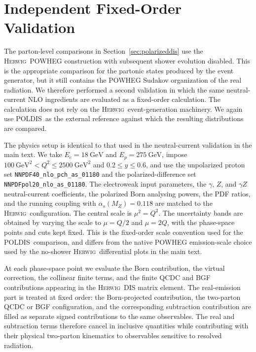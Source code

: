 \documentclass[a4paper,11pt]{article}
\newcommand{\Herwig}{\textsc{Herwig}}
\newcommand{\POLDIS}{\textsc{POLDIS}}
\begin{document}
\appendix

\section{Independent Fixed-Order Validation}
\label{app:standalone-fixed-order-validation}

The parton-level comparisons in Section~\ref{sec:polarizeddis} use the
\Herwig\ POWHEG construction with subsequent shower evolution disabled.  This
is the appropriate comparison for the partonic states produced by the event
generator, but it still contains the POWHEG Sudakov organization of the real
radiation.  We therefore performed a second validation in which the same
neutral-current NLO ingredients are evaluated as a fixed-order calculation.  The
calculation does not rely on the \Herwig\ event-generation machinery. We again use \POLDIS\
as the external reference against which the resulting distributions
are compared.

The physics setup is identical to that used in the neutral-current validation in
the main text.  We take $E_e=18~\mathrm{GeV}$ and $E_p=275~\mathrm{GeV}$,
impose $100~\mathrm{GeV}^2<Q^2\le2500~\mathrm{GeV}^2$ and $0.2\le y\le0.6$, and use
the unpolarized proton set \texttt{NNPDF40\_nlo\_pch\_as\_01180} and the
polarized-difference set \texttt{NNPDFpol20\_nlo\_as\_01180}.  The
electroweak input parameters, the $\gamma$, $Z$, and $\gamma Z$ neutral-current
coefficients, the polarized Born analysing powers, the PDF ratios, and the
running coupling with $\alpha_s(M_Z)=0.118$ are matched to the \Herwig\
configuration.  The central scale is $\mu^2=Q^2$. The uncertainty bands are
obtained by varying the scale to $\mu=Q/2$ and $\mu=2Q$, with the phase-space
points and cuts kept fixed.  This is the fixed-order scale convention used for
the \POLDIS\ comparison, and differs from the native POWHEG emission-scale
choice used by the no-shower \Herwig\ differential plots in the main text.

At each phase-space point we evaluate the Born contribution, the virtual
correction, the collinear finite terms, and the finite QCDC and BGF
contributions appearing in the \Herwig\ DIS matrix element.  The real-emission
part is treated at fixed order: the Born-projected contribution, the
two-parton QCDC or BGF configuration, and the corresponding subtraction
contribution are filled as separate signed contributions to the same
observables.  The real and subtraction terms therefore cancel in inclusive
quantities while contributing with their physical two-parton kinematics to
observables sensitive to resolved radiation.
\end{document}
